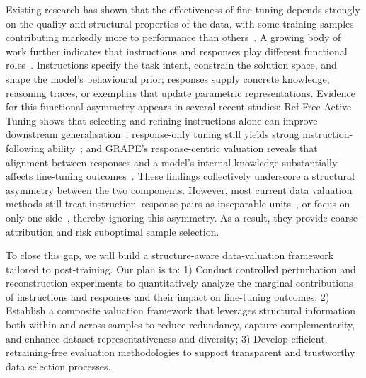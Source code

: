 \documentclass[12pt,a4paper]{article}
\begin{document}
Existing research has shown that the effectiveness of fine-tuning depends strongly on the quality and structural properties of the data, with some training samples contributing markedly more to performance than others~\cite{DBLP:conf/nips/ZhouLX0SMMEYYZG23, DBLP:conf/iclr/ChenLYWGYTS0HJ24, DBLP:conf/acl/WangKMLSKH23, DBLP:journals/corr/abs-2402-05123}. A growing body of work further indicates that instructions and responses play different functional roles~\cite{DBLP:conf/naacl/WuYCPWLY24}. Instructions specify the task intent, constrain the solution space, and shape the model’s behavioural prior; responses supply concrete knowledge, reasoning traces, or exemplars that update parametric representations. Evidence for this functional asymmetry appears in several recent studies: Ref-Free Active Tuning shows that selecting and refining instructions alone can improve downstream generalisation~\cite{DBLP:conf/pakdd/ZhangCM25}; response-only tuning still yields strong instruction-following ability~\cite{DBLP:journals/corr/abs-2409-14254}; and GRAPE’s response-centric valuation reveals that alignment between responses and a model’s internal knowledge substantially affects fine-tuning outcomes~\cite{DBLP:journals/corr/abs-2502-04194}. These findings collectively underscore a structural asymmetry between the two components. However, most current data valuation methods still treat instruction–response pairs as inseparable units~\cite{DBLP:conf/naacl/LiZLCC0W0024, DBLP:conf/icml/XiaMGA024, DBLP:conf/nips/Ouyang0JAWMZASR22, DBLP:conf/iclr/AnknerBSMLP25}, or focus on only one side~\cite{DBLP:journals/corr/abs-2412-11231, DBLP:conf/iclr/XuSZG0FTLJ24, DBLP:conf/iclr/DongLLX0Z025}, thereby ignoring this asymmetry. As a result, they provide coarse attribution and risk suboptimal sample selection.

To close this gap, we will build a structure-aware data-valuation framework tailored to post-training. Our plan is to: 1) Conduct controlled perturbation and reconstruction experiments to quantitatively analyze the marginal contributions of instructions and responses and their impact on fine-tuning outcomes; 2) Establish a composite valuation framework that leverages structural information both within and across samples to reduce redundancy, capture complementarity, and enhance dataset representativeness and diversity; 3) Develop efficient, retraining-free evaluation methodologies to support transparent and trustworthy data selection processes.

\vspace{-10pt}
\end{document}
